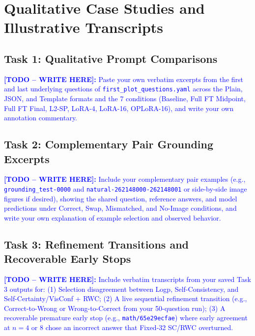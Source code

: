 \documentclass{article}
\newcommand{\writetodo}[1]{\noindent\textcolor{blue}{\textbf{[TODO -- WRITE HERE]:} #1}\par\medskip}
\begin{document}
\section{Qualitative Case Studies and Illustrative Transcripts}
\label{sec:app_qualitative}

\subsection{Task 1: Qualitative Prompt Comparisons}
\label{sec:app_t1_cases}
\writetodo{Paste your own verbatim excerpts from the first and last underlying questions of \texttt{first\_plot\_questions.yaml} across the Plain, JSON, and Template formats and the 7 conditions (Baseline, Full FT Midpoint, Full FT Final, L2-SP, LoRA-4, LoRA-16, OPLoRA-16), and write your own annotation commentary.}

\subsection{Task 2: Complementary Pair Grounding Excerpts}
\label{sec:app_t2_cases}
\writetodo{Include your complementary pair examples (e.g., \texttt{grounding\_test-0000} and \texttt{natural-262148000-262148001} or side-by-side image figures if desired), showing the shared question, reference answers, and model predictions under Correct, Swap, Mismatched, and No-Image conditions, and write your own explanation of example selection and observed behavior.}

\subsection{Task 3: Refinement Transitions and Recoverable Early Stops}
\label{sec:app_t3_cases}
\writetodo{Include verbatim transcripts from your saved Task 3 outputs for:
(1) Selection disagreement between Logp, Self-Consistency, and Self-Certainty/VisConf + RWC;
(2) A live sequential refinement transition (e.g., Correct-to-Wrong or Wrong-to-Correct from your 50-question run);
(3) A recoverable premature early stop (e.g., \texttt{math/65e29ecfae}) where early agreement at $n=4$ or $8$ chose an incorrect answer that Fixed-32 SC/RWC overturned.}
\end{document}

